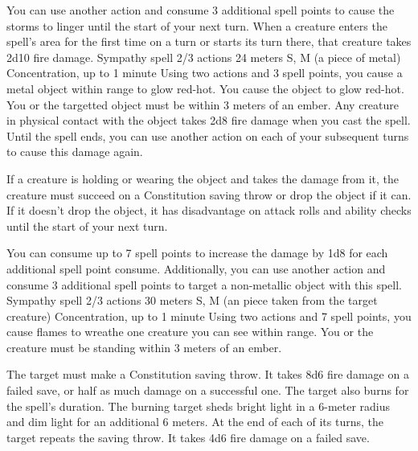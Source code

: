         You can use another action and consume 3 additional spell points to cause the storms to linger until the start of your next turn.
        When a creature enters the spell's area for the first time on a turn or starts its turn there, that creature takes 2d10 fire damage.
        {Sympathy spell}
        {2/3 actions}
        {24 meters}
        {S, M (a piece of metal)}
        {Concentration, up to 1 minute}
        Using two actions and 3 spell points, you cause a metal object within range to glow red-hot.
        You cause the object to glow red-hot.
        You or the targetted object must be within 3 meters of an ember.
        Any creature in physical contact with the object takes 2d8 fire damage when you cast the spell.
        Until the spell ends, you can use another action on each of your subsequent turns to cause this damage again.

        If a creature is holding or wearing the object and takes the damage from it, the creature must succeed on a Constitution saving throw or drop the object if it can.
        If it doesn't drop the object, it has disadvantage on attack rolls and ability checks until the start of your next turn.

        You can consume up to 7 spell points to increase the damage by 1d8 for each additional spell point consume.
        Additionally, you can use another action and consume 3 additional spell points to target a non-metallic object with this spell.
        {Sympathy spell}
        {2/3 actions}
        {30 meters}
        {S, M (an piece taken from the target creature)}
        {Concentration, up to 1 minute}
        Using two actions and 7 spell points, you cause flames to wreathe one creature you can see within range.
        You or the creature must be standing within 3 meters of an ember.

        The target must make a Constitution saving throw.
        It takes 8d6 fire damage on a failed save, or half as much damage on a successful one.
        The target also burns for the spell's duration.
        The burning target sheds bright light in a 6-meter radius and dim light for an additional 6 meters.
        At the end of each of its turns, the target repeats the saving throw.
        It takes 4d6 fire damage on a failed save.

